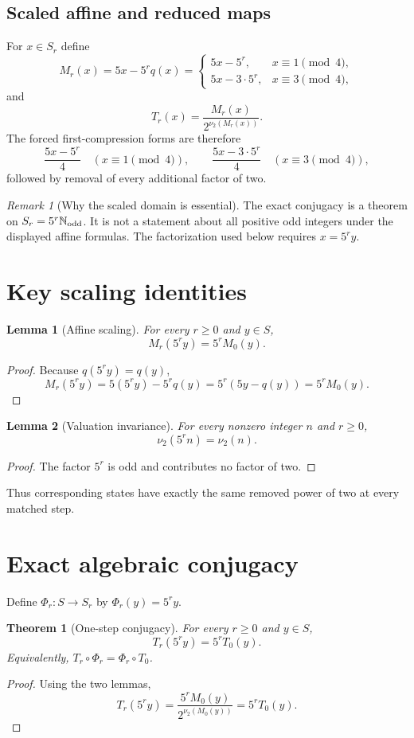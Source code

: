 \documentclass[11pt]{article}
\newtheorem{theorem}{Theorem}
\newtheorem{lemma}{Lemma}
\theoremstyle{remark}\newtheorem{remark}{Remark}
\newcommand{\Nodd}{\mathbb{N}_{\rm odd}}
\begin{document}
\subsection{Scaled affine and reduced maps}
For $x\in S_r$ define
\[
M_r(x)=5x-5^r q(x)
=\begin{cases}
5x-5^r,&x\equiv1\pmod4,\\
5x-3\cdot5^r,&x\equiv3\pmod4,
\end{cases}
\]
and
\[
T_r(x)=\frac{M_r(x)}{2^{\nu_2(M_r(x))}}.
\]
The forced first-compression forms are therefore
\[
\frac{5x-5^r}{4}\quad(x\equiv1\pmod4),\qquad
\frac{5x-3\cdot5^r}{4}\quad(x\equiv3\pmod4),
\]
followed by removal of every additional factor of two.

\begin{remark}[Why the scaled domain is essential]
The exact conjugacy is a theorem on $S_r=5^r\Nodd$.  It is not a statement about all positive odd integers under the displayed affine formulas.  The factorization used below requires $x=5^r y$.
\end{remark}

\section{Key scaling identities}
\begin{lemma}[Affine scaling]
For every $r\ge0$ and $y\in S$,
\[
M_r(5^r y)=5^rM_0(y).
\]
\end{lemma}
\begin{proof}
Because $q(5^r y)=q(y)$,
\[
M_r(5^r y)=5(5^r y)-5^r q(y)=5^r(5y-q(y))=5^rM_0(y).
\]
\end{proof}

\begin{lemma}[Valuation invariance]
For every nonzero integer $n$ and $r\ge0$,
\[
\nu_2(5^r n)=\nu_2(n).
\]
\end{lemma}
\begin{proof}
The factor $5^r$ is odd and contributes no factor of two.
\end{proof}
Thus corresponding states have exactly the same removed power of two at every matched step.

\section{Exact algebraic conjugacy}
Define $\Phi_r:S\to S_r$ by $\Phi_r(y)=5^r y$.
\begin{theorem}[One-step conjugacy]
For every $r\ge0$ and $y\in S$,
\[
T_r(5^r y)=5^rT_0(y).
\]
Equivalently, $T_r\circ\Phi_r=\Phi_r\circ T_0$.
\end{theorem}
\begin{proof}
Using the two lemmas,
\[
T_r(5^r y)=\frac{5^rM_0(y)}{2^{\nu_2(M_0(y))}}=5^rT_0(y).
\]
\end{proof}
\end{document}
